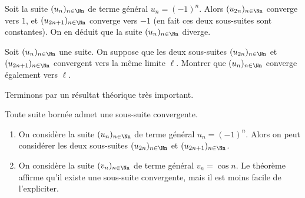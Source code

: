 \documentclass[class=report,crop=false]{standalone}
\begin{document}
\begin{exemple}
Soit la suite $(u_n)_{n\in \Nn}$ de terme général $u_n=(-1)^n$. Alors
$(u_{2n})_{n\in \Nn}$ converge vers $1$, et $(u_{2n+1})_{n\in \Nn}$ converge vers $-1$
(en fait ces deux sous-suites sont constantes). On en déduit que la suite $(u_n)_{n\in \Nn}$ diverge.
\end{exemple}


\begin{exercicecours}
  Soit $(u_n)_{n\in \Nn}$ une suite. On suppose que les deux sous-suites
$(u_{2n})_{n\in \Nn}$ et $(u_{2n+1})_{n\in \Nn}$ convergent vers la même limite $\ell$.
Montrer que $(u_n)_{n\in \Nn}$ converge également vers $\ell$.
\end{exercicecours}

Terminons par un résultat théorique très important.
\begin{theoreme}
\label{thm:Bolzano_Weierstrass}
  Toute suite bornée admet une sous-suite convergente.
\end{theoreme}

\begin{exemple}
\sauteligne
  \begin{enumerate}
    \item On considère la suite $(u_n)_{n\in \Nn}$ de terme général
$u_n=(-1)^n$. Alors on peut considérer les deux sous-suites $(u_{2n})_{n\in \Nn}$
et $(u_{2n+1})_{n\in \Nn}$.
    \item On considère la suite $(v_n)_{n\in \Nn}$ de terme général $v_n=\cos n$.
Le théorème affirme qu'il existe une sous-suite convergente, mais il est moins facile de l'expliciter.
  \end{enumerate}
\end{exemple}
\end{document}
